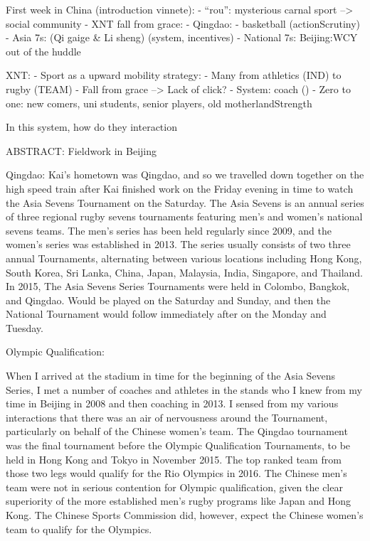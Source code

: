 First week in China (introduction vinnete):
- ``rou'': mysterious carnal sport --> social community
- XNT fall from grace:
- Qingdao:
    - basketball (actionScrutiny)
    - Asia 7s: (Qi gaige & Li sheng) (system, incentives)
    - National 7s: Beijing:WCY out of the huddle


XNT:
- Sport as a upward mobility strategy:
    - Many from athletics (IND) to rugby (TEAM)
- Fall from grace --> Lack of click?
- System: coach ()
- Zero to one: new comers, uni students, senior players, old motherlandStrength

In this system, how do they interaction

ABSTRACT:
Fieldwork in Beijing

















Qingdao:
Kai's hometown was Qingdao, and so we travelled down together on the high speed train after Kai finished work on the Friday evening in time to watch the Asia Sevens Tournament on the Saturday.  The Asia Sevens is an annual series of three regional rugby sevens tournaments featuring men's and women's national sevens teams.  The men's series has been held regularly since 2009, and the women's series was established in 2013. The series usually consists of two three annual Tournaments, alternating between various locations including Hong Kong, South Korea, Sri Lanka, China, Japan, Malaysia, India, Singapore, and Thailand.  In 2015, The Asia Sevens Series Tournaments were held in Colombo, Bangkok, and Qingdao. Would be played on the Saturday and Sunday, and then the National Tournament would follow immediately after on the Monday and Tuesday.



Olympic Qualification:

When I arrived at the stadium in time for the beginning of the Asia Sevens Series, I met a number of coaches and athletes in the stands who I knew from my time in Beijing in 2008 and then coaching in 2013. I sensed from my various interactions that there was an air of nervousness around the Tournament, particularly on behalf of the Chinese women's team.   The Qingdao tournament was the final tournament before the Olympic Qualification Tournaments, to be held in Hong Kong and Tokyo in November 2015.  The top ranked team from those two legs would qualify for the Rio Olympics in 2016.  The Chinese men's team were not in serious contention for Olympic qualification, given the clear superiority of the more established men's rugby programs like Japan and Hong Kong. The Chinese Sports Commission did, however, expect the Chinese women's team to qualify for the Olympics.

